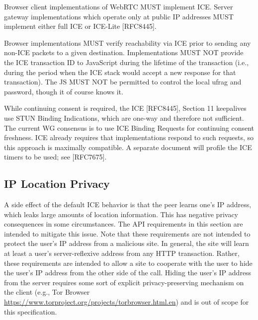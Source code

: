 \documentclass{article}
\begin{document}
Browser client implementations of WebRTC MUST implement ICE.  Server
gateway implementations which operate only at public IP addresses
MUST implement either full ICE or ICE-Lite [RFC8445].

Browser implementations MUST verify reachability via ICE prior to
sending any non-ICE packets to a given destination.  Implementations
MUST NOT provide the ICE transaction ID to JavaScript during the
lifetime of the transaction (i.e., during the period when the ICE
stack would accept a new response for that transaction).  The JS MUST
NOT be permitted to control the local ufrag and password, though it
of course knows it.

While continuing consent is required, the ICE [RFC8445], Section 11
keepalives use STUN Binding Indications, which are one-way and
therefore not sufficient.  The current WG consensus is to use ICE
Binding Requests for continuing consent freshness.  ICE already
requires that implementations respond to such requests, so this
approach is maximally compatible.  A separate document will profile
the ICE timers to be used; see [RFC7675].

\subsection{IP Location Privacy}

A side effect of the default ICE behavior is that the peer learns
one's IP address, which leaks large amounts of location information.
This has negative privacy consequences in some circumstances.  The
API requirements in this section are intended to mitigate this issue.
Note that these requirements are not intended to protect the user's
IP address from a malicious site.  In general, the site will learn at
least a user's server-reflexive address from any HTTP transaction.
Rather, these requirements are intended to allow a site to cooperate
with the user to hide the user's IP address from the other side of
the call.  Hiding the user's IP address from the server requires some
sort of explicit privacy-preserving mechanism on the client (e.g.,
Tor Browser \url{https://www.torproject.org/projects/torbrowser.html.en})
and is out of scope for this specification.
\end{document}
